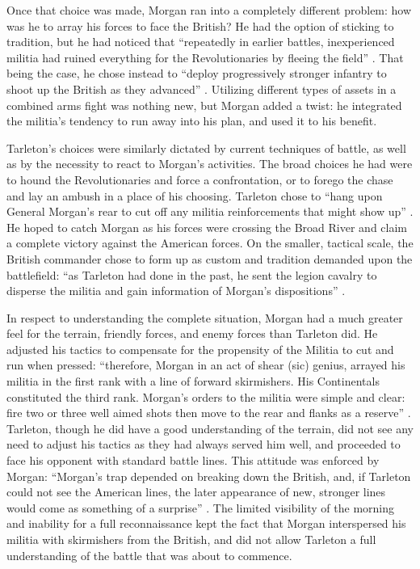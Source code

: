 Once that choice was made, Morgan ran into a completely different problem: how
was he to array his forces to face the British?  He had the option of sticking
to tradition, but he had noticed that ``repeatedly in earlier battles,
inexperienced militia had ruined everything for the Revolutionaries by fleeing
the field'' \cite[30]{weigley_partisan_1970}.  That being the case, he chose
instead to ``deploy progressively stronger infantry to shoot up the British as
they advanced'' \cite[71]{babits_devil_2001}.  Utilizing different types of
assets in a combined arms fight was nothing new, but Morgan added a twist: he
integrated the militia's tendency to run away into his plan, and used it to his
benefit.

Tarleton's choices were similarly dictated by current techniques of battle, as
well as by the necessity to react to Morgan's activities.  The broad choices he
had were to hound the Revolutionaries and force a confrontation, or to forego
the chase and lay an ambush in a place of his choosing.  Tarleton chose to
``hang upon General Morgan's rear to cut off any militia reinforcements that
might show up'' \cite[46]{fleming_cowpens_1988}.  He hoped to catch Morgan as
his forces were crossing the Broad River and claim a complete victory against
the American forces.  On the smaller, tactical scale, the British commander
chose to form up as custom and tradition demanded upon the battlefield:  ``as
Tarleton had done in the past, he sent the legion cavalry to disperse the
militia and gain information of Morgan's dispositions''
\cite[33]{brinkley_back_1998}.

In respect to understanding the complete situation, Morgan had a much greater
feel for the terrain, friendly forces, and enemy forces than Tarleton did.  He
adjusted his tactics to compensate for the propensity of the Militia to cut and
run when pressed: ``therefore, Morgan in an act of shear (sic) genius, arrayed
his militia in the first rank with a line of forward skirmishers.  His
Continentals constituted the third rank.  Morgan's orders to the militia were
simple and clear: fire two or three well aimed shots then move to the rear and
flanks as a reserve'' \cite[32]{brinkley_back_1998}. Tarleton, though he did
have a good understanding of the terrain, did not see any need to adjust his
tactics as they had always served him well, and proceeded to face his opponent
with standard battle lines.  This attitude was enforced by Morgan: ``Morgan's
trap depended on breaking down the British, and, if Tarleton could not see the
American lines, the later appearance of new, stronger lines would come as
something of a surprise'' \cite[82]{babits_devil_2001}.  The limited visibility
of the morning and inability for a full reconnaissance kept the fact that
Morgan interspersed his militia with skirmishers from the British, and did not
allow Tarleton  a full understanding of the battle that was about to commence.

